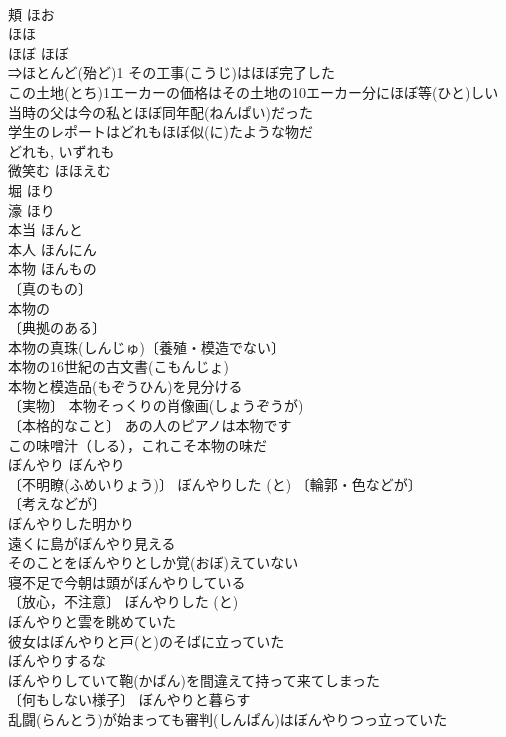 \documentclass[8pt]{extreport}
\begin{document}
\begin{CJK}{UTF8}{min}
\\	頬	ほお　
\\	ほほ	
\\	ほぼ	ほぼ	
\\	⇒ほとんど(殆ど)1 その工事(こうじ)はほぼ完了した 
\\	この土地(とち)1エーカーの価格はその土地の10エーカー分にほぼ等(ひと)しい 
\\	当時の父は今の私とほぼ同年配(ねんぱい)だった 
\\	学生のレポートはどれもほぼ似(に)たような物だ 
\\	どれも, いずれも　
\\	微笑む	ほほえむ	
\\	堀	ほり	
\\	濠	ほり	
\\	本当	ほんと	
\\	本人	ほんにん	
\\	本物	ほんもの	
\\	〔真のもの〕
\\	本物の 
\\	〔典拠のある〕
\\	本物の真珠(しんじゅ)〔養殖・模造でない〕 
\\	本物の16世紀の古文書(こもんじょ) 
\\	本物と模造品(もぞうひん)を見分ける 
\\	〔実物〕 本物そっくりの肖像画(しょうぞうが) 
\\	〔本格的なこと〕 あの人のピアノは本物です 
\\	この味噌汁（しる），これこそ本物の味だ 
\\	ぼんやり	ぼんやり	
\\	〔不明瞭(ふめいりょう)〕 ぼんやりした (と) 〔輪郭・色などが〕
\\	〔考えなどが〕
\\	ぼんやりした明かり 
\\	遠くに島がぼんやり見える 
\\	そのことをぼんやりとしか覚(おぼ)えていない 
\\	寝不足で今朝は頭がぼんやりしている 
\\	〔放心，不注意〕 ぼんやりした (と) 
\\	ぼんやりと雲を眺めていた 
\\	彼女はぼんやりと戸(と)のそばに立っていた 
\\	ぼんやりするな 
\\	ぼんやりしていて鞄(かばん)を間違えて持って来てしまった 
\\	〔何もしない様子〕 ぼんやりと暮らす 
\\	乱闘(らんとう)が始まっても審判(しんぱん)はぼんやりつっ立っていた 

\end{CJK}
\end{document}
